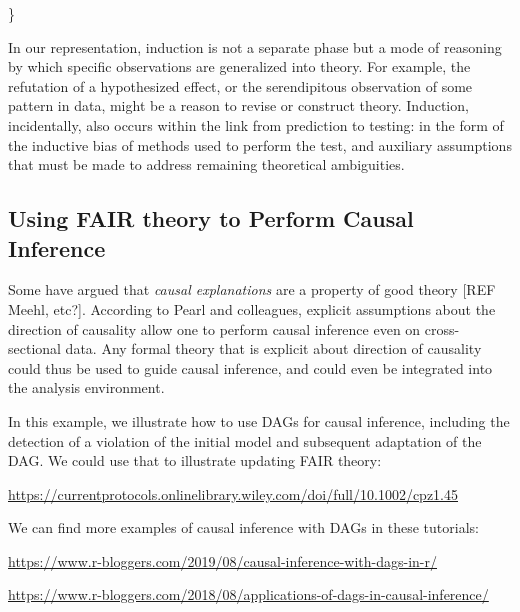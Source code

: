 \documentclass[
  man,floatsintext]{apa6}
\begin{document}
\}

In our representation,
induction is not a separate phase but a mode of reasoning by which specific observations are generalized into theory.
For example, the refutation of a hypothesized effect,
or the serendipitous observation of some pattern in data,
might be a reason to revise or construct theory.
Induction, incidentally, also occurs within the link from prediction to testing:
in the form of the inductive bias of methods used to perform the test,
and auxiliary assumptions that must be made to address remaining theoretical ambiguities.

\subsection{Using FAIR theory to Perform Causal Inference}\label{using-fair-theory-to-perform-causal-inference}

Some have argued that \emph{causal explanations} are a property of good theory {[}REF Meehl, etc?{]}.
According to Pearl and colleagues,
explicit assumptions about the direction of causality allow one to perform causal inference even on cross-sectional data.
Any formal theory that is explicit about direction of causality could thus be used to guide causal inference,
and could even be integrated into the analysis environment.

In this example, we illustrate how to use DAGs for causal inference, including the detection of a violation of the initial model and subsequent adaptation of the DAG. We could use that to illustrate updating FAIR theory:

\url{https://currentprotocols.onlinelibrary.wiley.com/doi/full/10.1002/cpz1.45}

We can find more examples of causal inference with DAGs in these tutorials:

\url{https://www.r-bloggers.com/2019/08/causal-inference-with-dags-in-r/}

\url{https://www.r-bloggers.com/2018/08/applications-of-dags-in-causal-inference/}
\end{document}
